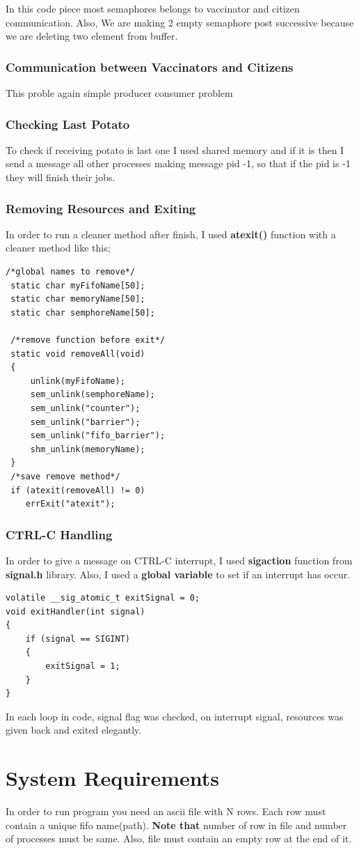 \documentclass{article}
\begin{document}
In this code piece most semaphores belongs to vaccinator and citizen communication.
Also, We are making 2 empty semaphore post successive because we are deleting two element from buffer.
\subsubsection{Communication between Vaccinators and Citizens}
This proble again simple producer consumer problem
\subsubsection{Checking Last Potato}
To check if receiving potato is last one I used shared memory and if it is then I send a message all other processes making message pid -1,
so that if the pid is -1 they will finish their jobs.
\subsubsection{Removing Resources and Exiting}
In order to run a cleaner method after finish, I used \textbf{atexit()} function with a cleaner method like this;
\begin{lstlisting}[style=CStyle]
 /*global names to remove*/
 static char myFifoName[50];
 static char memoryName[50];
 static char semphoreName[50];

 /*remove function before exit*/
 static void removeAll(void)
 {
     unlink(myFifoName);
     sem_unlink(semphoreName);
     sem_unlink("counter");
     sem_unlink("barrier");
     sem_unlink("fifo_barrier");
     shm_unlink(memoryName);
 }
 /*save remove method*/
 if (atexit(removeAll) != 0)
    errExit("atexit");
\end{lstlisting}

\subsubsection{CTRL-C Handling}
In order to give a message on CTRL-C interrupt, I used \textbf{sigaction} function from \textbf{signal.h} library.
Also, I used a \textbf{global variable} to set if an interrupt has occur.
\begin{lstlisting}[style=CStyle]
volatile __sig_atomic_t exitSignal = 0;
void exitHandler(int signal)
{
    if (signal == SIGINT)
    {
        exitSignal = 1;
    }
}
\end{lstlisting}
In each loop in code, signal flag was checked, on interrupt signal, resources was given back and exited elegantly.
\section{System Requirements}
In order to run program you need an ascii file with N rows. Each row must contain a unique fifo name(path).
\textbf{Note that} number of row in file and number of processes must be same. Also, file must contain an empty row at the end of it.
\end{document}
